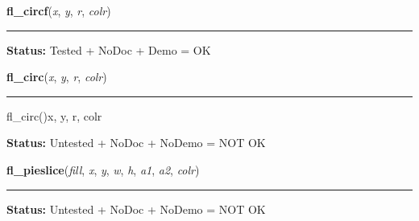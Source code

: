     \label{xformslib:library:fl_circf}

    \vspace{0.5ex}

\hspace{.8\funcindent}\begin{boxedminipage}{\funcwidth}

    \raggedright \textbf{fl\_circf}(\textit{x}, \textit{y}, \textit{r}, \textit{colr})

    \vspace{-1.5ex}

    \rule{\textwidth}{0.5\fboxrule}
\setlength{\parskip}{2ex}
\setlength{\parskip}{1ex}
\textbf{Status:} Tested + NoDoc + Demo = OK



    \end{boxedminipage}

    \label{xformslib:library:fl_circ}

    \vspace{0.5ex}

\hspace{.8\funcindent}\begin{boxedminipage}{\funcwidth}

    \raggedright \textbf{fl\_circ}(\textit{x}, \textit{y}, \textit{r}, \textit{colr})

    \vspace{-1.5ex}

    \rule{\textwidth}{0.5\fboxrule}
\setlength{\parskip}{2ex}
    fl\_circ()x, y, r, colr

\setlength{\parskip}{1ex}
\textbf{Status:} Untested + NoDoc + NoDemo = NOT OK



    \end{boxedminipage}

    \label{xformslib:library:fl_pieslice}

    \vspace{0.5ex}

\hspace{.8\funcindent}\begin{boxedminipage}{\funcwidth}

    \raggedright \textbf{fl\_pieslice}(\textit{fill}, \textit{x}, \textit{y}, \textit{w}, \textit{h}, \textit{a1}, \textit{a2}, \textit{colr})

    \vspace{-1.5ex}

    \rule{\textwidth}{0.5\fboxrule}
\setlength{\parskip}{2ex}
\setlength{\parskip}{1ex}
\textbf{Status:} Untested + NoDoc + NoDemo = NOT OK



    \end{boxedminipage}

